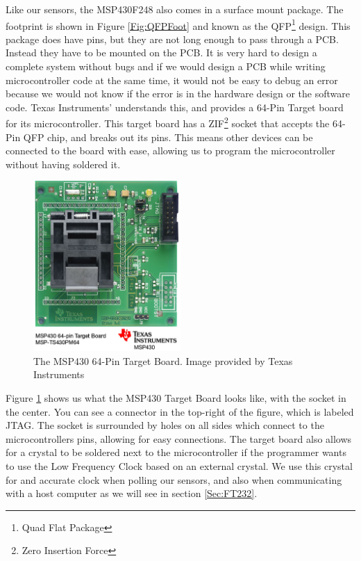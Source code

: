 Like our sensors, the MSP430F248 also comes in a surface mount package.
The footprint is shown in Figure \ref{Fig:QFPFoot}
and known as the QFP\footnote{Quad Flat Package} design.
This package does have pins, but they are not long enough to pass through a PCB.
Instead they have to be mounted on the PCB.
It is very hard to design a complete system without bugs and if we would design a PCB
while writing microcontroller code at the same time,
it would not be easy to debug an error because we would not know if the error
is in the hardware design or the software code. Texas Instruments' understands this,
and provides a 64-Pin Target board for its microcontroller. This target board has
a ZIF\footnote{Zero Insertion Force} socket that accepts the 64-Pin QFP chip,
and breaks out its pins. This means other devices can be connected to the board with ease,
allowing us to program the microcontroller without having soldered it.
\begin{figure}
\begin{center}
\includegraphics[width=0.5\textwidth]{images/mspts430pm64.jpg}
\caption{The MSP430 64-Pin Target Board. Image provided by Texas Instruments}
\label{Fig:MSPTarget}
\end{center}
\end{figure}

Figure \ref{Fig:MSPTarget} shows us what the MSP430 Target Board looks like, with the socket in the center. You can see a connector in the top-right of the figure, which is labeled JTAG. The socket is surrounded by holes on all sides which connect to the microcontrollers pins, allowing for easy connections. The target board also allows for a crystal to be soldered next to the microcontroller if the programmer wants to use the Low Frequency Clock based on an external crystal. We use this crystal for and accurate clock when polling our sensors, and also when communicating with a host computer as we will see in section \ref{Sec:FT232}.

